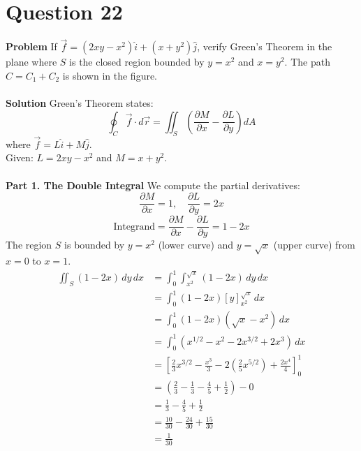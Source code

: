 \documentclass{article}
\begin{document}
\section{Question 22}
\textbf{Problem}
If $\vec{f} = (2xy - x^2)\hat{i} + (x + y^2)\hat{j}$, verify Green's Theorem in
the plane where $S$ is the closed region bounded by $y=x^2$ and $x=y^2$. The
path $C = C_1 + C_2$ is shown in the figure.
\\
\\
\textbf{Solution}
Green's Theorem states:
\[
	\oint_C \vec{f} \cdot d\vec{r} = \iint_S \left( \frac{\partial M}{\partial x} - \frac{\partial L}{\partial y} \right) dA
\]
where $\vec{f} = L\hat{i} + M\hat{j}$.
\\
Given: $L = 2xy - x^2$ and $M = x + y^2$.
\\
\\
\textbf{Part 1. The Double Integral}
We compute the partial derivatives:
\[
	\frac{\partial M}{\partial x} = 1, \quad \frac{\partial L}{\partial y} = 2x
\]
\[
	\text{Integrand} = \frac{\partial M}{\partial x} - \frac{\partial L}{\partial y} = 1 - 2x
\]
The region $S$ is bounded by $y=x^2$ (lower curve) and $y=\sqrt{x}$ (upper curve) from $x=0$ to $x=1$.
\begin{align*}
	\iint_S (1 - 2x) \, dy \, dx & = \int_0^1 \int_{x^2}^{\sqrt{x}} (1 - 2x) \, dy \, dx                                                       \\
	                             & = \int_0^1 (1 - 2x) [y]_{x^2}^{\sqrt{x}} \, dx                                                              \\
	                             & = \int_0^1 (1 - 2x)(\sqrt{x} - x^2) \, dx                                                                   \\
	                             & = \int_0^1 (x^{1/2} - x^2 - 2x^{3/2} + 2x^3) \, dx                                                          \\
	                             & = \left[ \frac{2}{3}x^{3/2} - \frac{x^3}{3} - 2\left(\frac{2}{5}x^{5/2}\right) + \frac{2x^4}{4} \right]_0^1 \\
	                             & = \left( \frac{2}{3} - \frac{1}{3} - \frac{4}{5} + \frac{1}{2} \right) - 0                                  \\
	                             & = \frac{1}{3} - \frac{4}{5} + \frac{1}{2}                                                                   \\
	                             & = \frac{10}{30} - \frac{24}{30} + \frac{15}{30}                                                             \\
	                             & = \frac{1}{30}
\end{align*}
\end{document}
